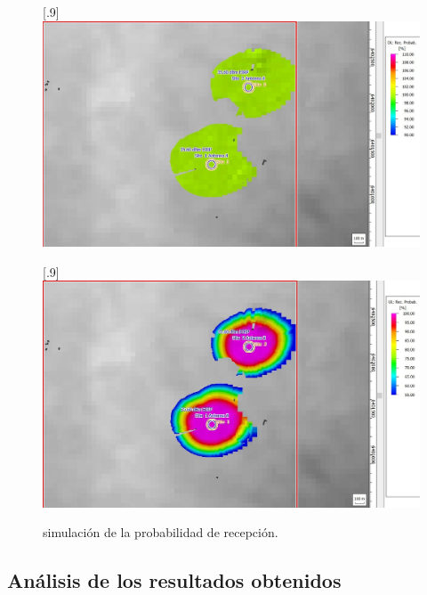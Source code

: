 \documentclass[11pt,a4paper]{article}
\begin{document}
\begin{figure}[ht!]
  \centering
  [.9\linewidth]{\includegraphics[height=14\baselineskip]{fotos_ema/dl_prob_rec_5.jpg}}

  [.9\linewidth]{\includegraphics[height=14\baselineskip]{fotos_ema/ul_prob_rec_5.jpg}}
  \caption{simulación de la probabilidad de recepción.}
  \label{fig:prob_rec_5}
\end{figure}

\clearpage

\subsection{Análisis de los resultados obtenidos}
\end{document}
